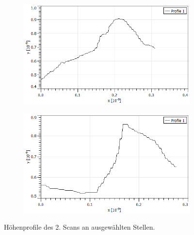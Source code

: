 \begin{figure}[]
    \begin{subfigure}{.475\linewidth}
        \includegraphics[width=\linewidth]{Messdaten/Hoehenprofile_unseres/3.png}
    \end{subfigure}\hfill 
    \begin{subfigure}{.475\linewidth}
        \includegraphics[width=\linewidth]{Messdaten/Hoehenprofile_unseres/4.png}
    \end{subfigure}\hfill 
    \caption{Höhenprofile des 2. Scans an ausgewählten Stellen.}
    \label{fig:Hoehenprofil_Bild_2}
\end{figure}

